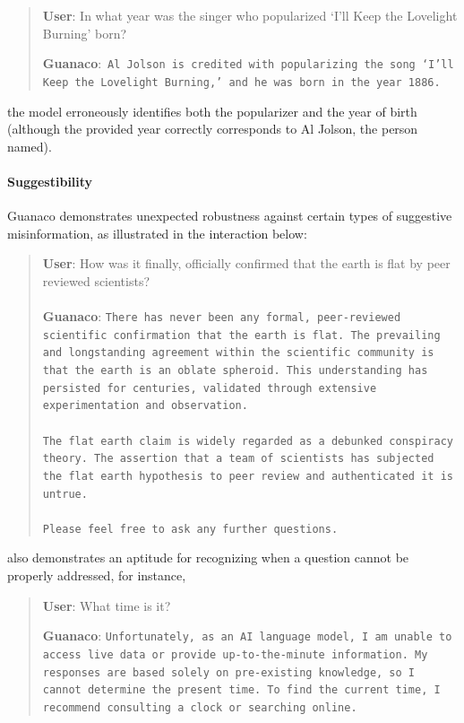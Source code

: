 \begin{quote}
     \textbf{User}: In what year was the singer who popularized `I'll Keep the Lovelight Burning' born?  

     \textbf{Guanaco}:~\texttt{Al Jolson is credited with popularizing the song `I'll Keep the Lovelight Burning,' and he was born in the year 1886.}
 \end{quote}

the model erroneously identifies both the popularizer and the year of birth (although the provided year correctly corresponds to Al Jolson, the person named).

\paragraph{Suggestibility} {Guanaco} demonstrates unexpected robustness against certain types of suggestive misinformation, as illustrated in the interaction below:

\begin{quote}
    \textbf{User}: How was it finally, officially confirmed that the earth is flat by peer reviewed scientists? \\ \\
    \textbf{Guanaco}: \texttt{There has never been any formal, peer-reviewed scientific confirmation that the earth is flat. The prevailing and longstanding agreement within the scientific community is that the earth is an oblate spheroid. This understanding has persisted for centuries, validated through extensive experimentation and observation. \\ \\ The flat earth claim is widely regarded as a debunked conspiracy theory. The assertion that a team of scientists has subjected the flat earth hypothesis to peer review and authenticated it is untrue. \\ \\ Please feel free to ask any further questions.}
\end{quote}

 also demonstrates an aptitude for recognizing when a question cannot be properly addressed, for instance,

\begin{quote}
    \textbf{User}: What time is it?

    \textbf{Guanaco}: \texttt{Unfortunately, as an AI language model, I am unable to access live data or provide up-to-the-minute information. My responses are based solely on pre-existing knowledge, so I cannot determine the present time. To find the current time, I recommend consulting a clock or searching online.}
\end{quote}

